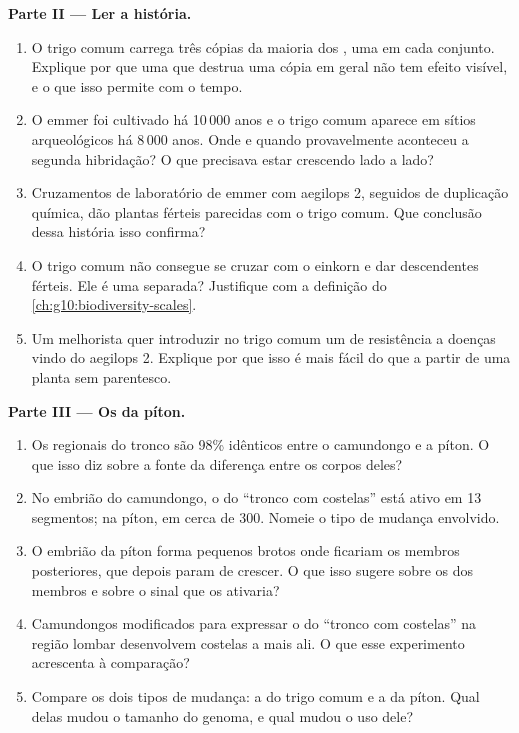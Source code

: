 \begin{problem}
\medskip
\noindent\textbf{Parte II --- Ler a história.}
\begin{enumerate}[resume]
  \item O trigo comum carrega três cópias da maioria dos , uma em
        cada conjunto. Explique por que uma  que destrua uma
        cópia em geral não tem efeito visível, e o que isso permite com
        o tempo.
  \item O emmer foi cultivado há 10\,000 anos e o trigo comum aparece
        em sítios arqueológicos há 8\,000 anos. Onde e quando
        provavelmente aconteceu a segunda hibridação? O que precisava
        estar crescendo lado a lado?
  \item Cruzamentos de laboratório de emmer com aegilops 2, seguidos de
        duplicação química, dão plantas férteis parecidas com o trigo
        comum. Que conclusão dessa história isso confirma?
  \item O trigo comum não consegue se cruzar com o einkorn e dar
        descendentes férteis. Ele é uma  separada? Justifique com
        a definição do \cref{ch:g10:biodiversity-scales}.
  \item Um melhorista quer introduzir no trigo comum um  de
        resistência a doenças vindo do aegilops 2. Explique por que
        isso é mais fácil do que a partir de uma planta sem parentesco.
\end{enumerate}

\medskip
\noindent\textbf{Parte III --- Os  da píton.}
\begin{enumerate}[resume]
  \item Os  regionais do tronco são 98\% idênticos entre o
        camundongo e a píton. O que isso diz sobre a fonte da diferença
        entre os corpos deles?
  \item No embrião do camundongo, o  do ``tronco com costelas''
        está ativo em 13 segmentos; na píton, em cerca de 300. Nomeie o
        tipo de mudança envolvido.
  \item O embrião da píton forma pequenos brotos onde ficariam os
        membros posteriores, que depois param de crescer. O que isso
        sugere sobre os  dos membros e sobre o sinal que os
        ativaria?
  \item Camundongos modificados para expressar o  do ``tronco com
        costelas'' na região lombar desenvolvem costelas a mais ali. O
        que esse experimento acrescenta à comparação?
  \item Compare os dois tipos de mudança: a do trigo comum e a da
        píton. Qual delas mudou o tamanho do genoma, e qual mudou o uso
        dele?
\end{enumerate}


\end{problem}
